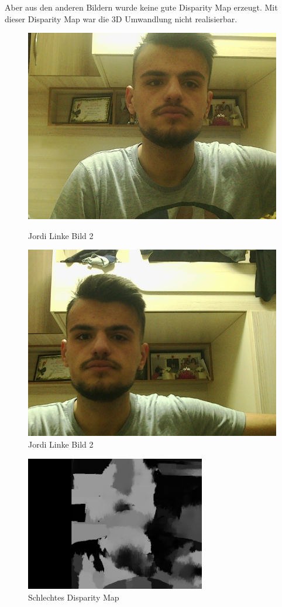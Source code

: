 Aber aus den anderen Bildern wurde keine gute Disparity Map erzeugt. Mit dieser Disparity Map war die 3D Umwandlung nicht realisierbar.
\begin{figure}[!htb]
   \begin{minipage}{0.48\textwidth}
     \centering
     \includegraphics[width=.7\linewidth]{./figures/frameL.jpg}
     \caption{Jordi Linke Bild 2}
   \end{minipage}\hfill
   \begin{minipage}{0.48\textwidth}
     \centering
     \includegraphics[width=.7\linewidth]{./figures/frameR.jpg}
     \caption{Jordi Linke Bild 2}
   \end{minipage}
\end{figure}
\begin{figure}[!htb]
  \centering
    \includegraphics[width=0.7\textwidth]{./figures/dispbad.jpg}
      \caption{Schlechtes Disparity Map}
\end{figure}
\newpage
